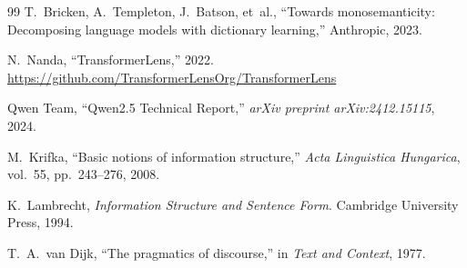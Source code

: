\documentclass[10pt, letterpaper]{article}
\begin{document}
\begin{thebibliography}{99}
T.~Bricken, A.~Templeton, J.~Batson, et~al., ``Towards monosemanticity: Decomposing language models with dictionary learning,'' Anthropic, 2023.

N.~Nanda, ``TransformerLens,'' 2022. \url{https://github.com/TransformerLensOrg/TransformerLens}

Qwen Team, ``Qwen2.5 Technical Report,'' \textit{arXiv preprint arXiv:2412.15115}, 2024.

M.~Krifka, ``Basic notions of information structure,'' \textit{Acta Linguistica Hungarica}, vol.~55, pp.~243--276, 2008.

K.~Lambrecht, \textit{Information Structure and Sentence Form}. Cambridge University Press, 1994.

T.~A.~van Dijk, ``The pragmatics of discourse,'' in \textit{Text and Context}, 1977.

\end{thebibliography}
\end{document}

